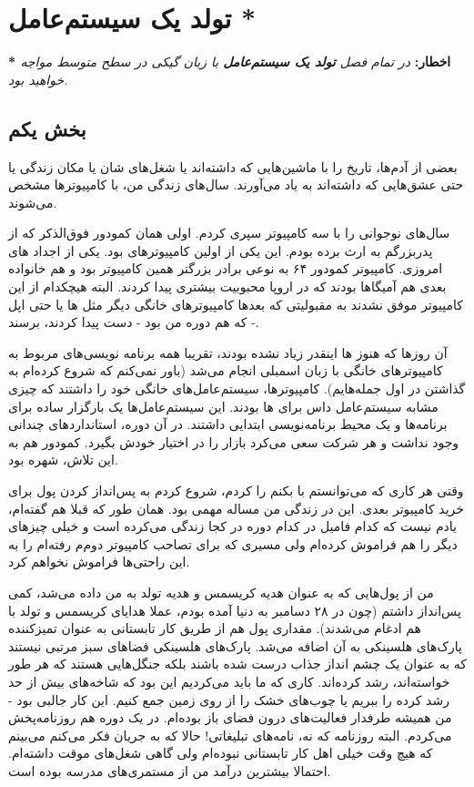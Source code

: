 \chapter[تولد یک سیستم‌عامل]{تولد یک سیستم‌عامل *}
\vfill
\begin{alertbox}
\textbf{* اخطار:}
\emph{در تمام فصل \textbf{تولد یک سیستم‌عامل} با زبان
  گیکی در سطح متوسط مواجه خواهید بود.}
\end{alertbox}

\section{بخش یکم}
بعضی از آدم‌ها، تاریخ را با ماشین‌هایی که داشته‌اند یا شغل‌های شان یا مکان
زندگی یا حتی عشق‌هایی که داشته‌اند به یاد می‌آورند. سال‌های زندگی من، با
کامپیوترها مشخص می‌شوند.

سال‌های نوجوانی را با سه کامپیوتر سپری کردم. اولی همان کمودور
 فوق‌الذکر که از پدربزرگم به ارث برده بودم. این یکی از اولین
کامپیوترهای  بود. یکی از اجداد های
امروزی. کامپیوتر کمودور ۶۴ به نوعی برادر بزرگتر همین کامپیوتر بود و هم
خانواده بعدی هم آمیگاها بودند که در اروپا محبوبیت بیشتری پیدا
کردند. البته هیچکدام از این کامپیوتر موفق نشدند به مقبولیتی که بعدها
کامپیوترهای خانگی دیگر مثل ها یا حتی اپل  - که هم دوره
 من بود - دست پیدا کردند، برسند.

آن روزها که هنوز ها اینقدر زیاد نشده بودند، تقریبا همه برنامه
نویسی‌های مربوط به کامپیوترهای خانگی با زبان اسمبلی انجام می‌شد (باور
نمی‌کنم که شروع کرده‌ام به گذاشتن  در اول
جمله‌هایم). کامپیوترها،‌ سیستم‌عامل‌های خانگی خود را داشتند که چیزی مشابه
سیستم‌عامل داس برای ها بودند. این
سیستم‌عامل‌ها یک بارگزار ساده برای برنامه‌ها و یک محیط برنامه‌نویسی
ابتدایی داشتند. در آن دوره، استانداردهای چندانی وجود نداشت و هر شرکت
سعی می‌کرد بازار را در اختیار خودش بگیرد. کمودور هم به این تلاش، شهره
بود.

وقتی هر کاری که می‌توانستم با  بکنم را کردم، شروع کردم به پس‌انداز
کردن پول برای خرید کامپیوتر بعدی. این در زندگی من مساله مهمی بود. همان
طور که قبلا هم گفته‌ام، یادم نیست که کدام فامیل در کدام دوره در کجا
زندگی می‌کرده است و خیلی چیزهای دیگر را هم فراموش کرده‌ام ولی مسیری که
برای تصاحب کامپیوتر دوم‌م رفته‌ام را به این راحتی‌ها فراموش نخواهم کرد.

من از پول‌هایی که به عنوان هدیه کریسمس و هدیه تولد به من داده می‌شد، کمی
پس‌انداز داشتم (چون در ۲۸ دسامبر به دنیا آمده بودم، عملا هدایای کریسمس
و تولد با هم ادغام می‌شدند). مقداری پول هم از طریق کار تابستانی به
عنوان تمیزکننده پارک‌های هلسینکی به آن اضافه می‌شد. پارک‌های هلسینکی
فضاهای سبز مرتبی نیستند که به عنوان یک چشم انداز جذاب درست شده باشند
بلکه جنگل‌هایی هستند که هر طور خواسته‌اند، رشد کرده‌اند. کاری که ما باید
می‌کردیم این بود که شاخه‌های بیش از حد رشد کرده را ببریم یا چوب‌های خشک
را از روی زمین جمع کنیم. این کار جالبی بود - من همیشه طرفدار فعالیت‌های
درون فضای باز بوده‌ام. در یک دوره هم روزنامه‌پخش‌ می‌کردم. البته روزنامه‌
که نه، نامه‌های تبلیغاتی! حالا که به جریان فکر می‌کنم می‌بینم که هیچ وقت
خیلی اهل کار تابستانی نبوده‌ام ولی گاهی شغل‌های موقت داشته‌ام. احتمالا
بیشترین درآمد من از مستمری‌های مدرسه بوده است.

